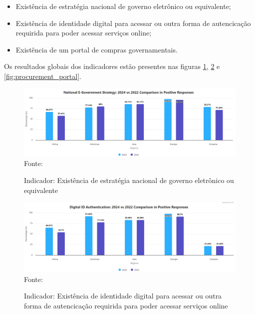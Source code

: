 \begin{itemize}
    \item Existência de estratégia nacional de governo eletrônico ou equivalente;
    \item Existência de identidade digital para acessar ou outra forma de autencicação requirida para poder acessar serviços online;
    \item Existência de um portal de compras governamentais.
\end{itemize}

Os resultados globais dos indicadores estão presentes nas figuras \ref{fig:national_government_strategy}, \ref{fig:national_identity} e \ref{fig:procurement_portal}.

\begin{figure}[H]
	\centering
	\caption{Indicador: Existência de estratégia nacional de governo eletrônico ou equivalente}
	\includegraphics[width=1\linewidth]{figuras/ict_in_government/national_government_strategy}
	\label{fig:national_government_strategy}
	\footnotesize{Fonte: \cite{ONU_ICT_in_government_indicators}}
\end{figure}

\begin{figure}[H]
	\centering
	\caption{Indicador: Existência de identidade digital para acessar ou outra forma de autencicação requirida para poder acessar serviços online}
	\includegraphics[width=1\linewidth]{figuras/ict_in_government/digital_identity}
	\label{fig:national_identity}
	\footnotesize{Fonte: \cite{ONU_ICT_in_government_indicators}}
\end{figure}

